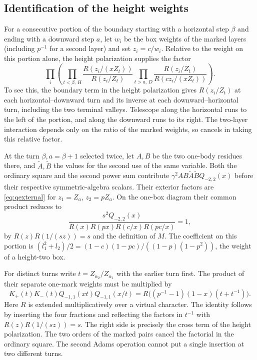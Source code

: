 \subsection{Identification of the height weights}
For a consecutive portion of the boundary starting with a horizontal
step $\beta$ and ending with a downward step $a$, let $w_i$ be the
box weights of the marked layers (including $p^{-1}$ for a second
layer) and set $z_i=c/w_i$. Relative to the weight on this portion
alone, the height polarization supplies the factor
\begin{equation}\label{eq:qexternal}
 \prod_i\left(
  \prod_{t<\beta,\,H}\frac{R(z_i/(xZ_t))}{R(z_i/Z_t)}
  \prod_{t>a,\,D}\frac{R(z_i/Z_t)}{R(cz_i/(xZ_t))}
 \right).
\end{equation}
To see this, the boundary term in the height polarization gives
$R(z_i/Z_t)$ at each horizontal--downward turn and its inverse at
each downward--horizontal turn, including the two terminal valleys.
Telescope along the horizontal runs to the left of the portion, and
along the downward runs to its right. The two-layer interaction
depends only on the ratio of the marked weights, so cancels in taking
this relative factor.

At the turn $\beta,a=\beta+1$ selected twice, let $A,B$ be the two
one-body residues there, and $\widetilde A,\widetilde B$ the values for
the second use of the same variable. Both the ordinary square and
the second power sum contribute
$\gamma^2 AB\widetilde A\widetilde B Q_{-2,2}(x)$ before their
respective symmetric-algebra scalars. Their exterior factors are
\eqref{eq:qexternal} for $z_1=Z_a$, $z_2=pZ_a$. On the one-box
diagram their common product reduces to
\[
 \frac{s^2Q_{-2,2}(x)}{R(x)R(px)R(c/x)R(pc/x)}=1,
\]
by $R(z)R(1/(sz))=s$ and the definition of $M$. The coefficient on
this portion is $(l_1^2+l_2)/2=(1-c)(1-pc)/((1-p)(1-p^2))$,
the weight of a height-two box.

For distinct turns write $t=Z_{\alpha_2}/Z_{\alpha_1}$ with the
earlier turn first. The product of their separate one-mark weights
must be multiplied by
\[
 K_+(t)K_-(t)Q_{-1,1}(xt)Q_{-1,1}(x/t)
     =R\big((p^{-1}-1)(1-x)(t+t^{-1})\big).
\]
Here $R$ is extended multiplicatively over a virtual character.
The identity follows by inserting the four fractions and reflecting
the factors in $t^{-1}$ with $R(z)R(1/(sz))=s$. The right side is
precisely the cross term of the height polarization. The two orders of
the marked pairs cancel the factorial in the ordinary square.
The second Adams operation cannot put a single insertion at two
different turns.

